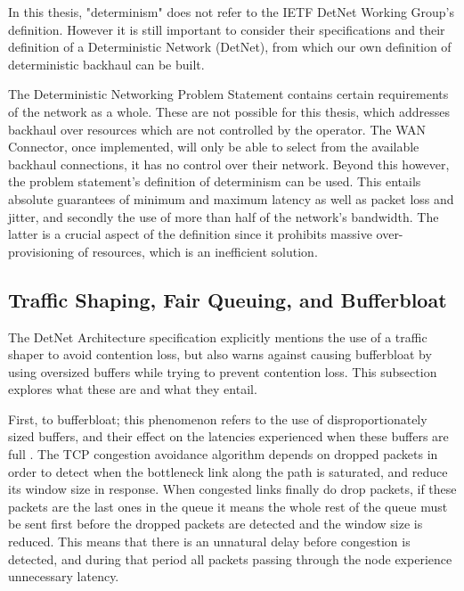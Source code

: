 In this thesis, "determinism" does not refer to the IETF DetNet Working Group's definition. However it is still important to consider their specifications and their definition of a Deterministic Network (DetNet), from which our own definition of deterministic backhaul can be built.

The Deterministic Networking Problem Statement contains certain requirements of the network as a whole. These are not possible for this thesis, which addresses backhaul over resources which are not controlled by the operator. The WAN Connector, once implemented, will only be able to select from the available backhaul connections, it has no control over their network. Beyond this however, the problem statement's definition of determinism can be used. This entails absolute guarantees of minimum and maximum latency as well as packet loss and jitter, and secondly the use of more than half of the network's bandwidth. The latter is a crucial aspect of the definition since it prohibits massive over-provisioning of resources, which is an inefficient solution.

\subsection{Traffic Shaping, Fair Queuing, and Bufferbloat}

The DetNet Architecture specification \cite{detnet-arch} explicitly mentions the use of a traffic shaper to avoid contention loss, but also warns against causing bufferbloat by using oversized buffers while trying to prevent contention loss. This subsection explores what these are and what they entail.

First, to bufferbloat; this phenomenon refers to the use of disproportionately sized buffers, and their effect on the latencies experienced when these buffers are full \cite{allman2012comments, gettys2011bufferbloat}. The TCP congestion avoidance algorithm depends on dropped packets in order to detect when the bottleneck link along the path is saturated, and reduce its window size in response. When congested links finally do drop packets, if these packets are the last ones in the queue it means the whole rest of the queue must be sent first before the dropped packets are detected and the window size is reduced. This means that there is an unnatural delay before congestion is detected, and during that period all packets passing through the node experience unnecessary latency. %

